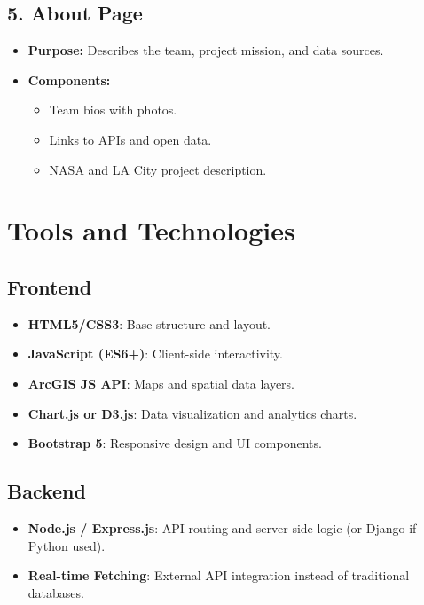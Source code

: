 \documentclass[12pt]{article}
\begin{document}
\subsection{5. About Page}
\begin{itemize}[leftmargin=*]
    \item \textbf{Purpose:} Describes the team, project mission, and data sources.
    \item \textbf{Components:}
    \begin{itemize}
        \item Team bios with photos.
        \item Links to APIs and open data.
        \item NASA and LA City project description.
    \end{itemize}
\end{itemize}

\newpage
\section{Tools and Technologies}

\subsection{Frontend}
\begin{itemize}[leftmargin=*]
    \item \textbf{HTML5/CSS3}: Base structure and layout.
    \item \textbf{JavaScript (ES6+)}: Client-side interactivity.
    \item \textbf{ArcGIS JS API}: Maps and spatial data layers.
    \item \textbf{Chart.js or D3.js}: Data visualization and analytics charts.
    \item \textbf{Bootstrap 5}: Responsive design and UI components.
\end{itemize}

\subsection{Backend}
\begin{itemize}[leftmargin=*]
    \item \textbf{Node.js / Express.js}: API routing and server-side logic (or Django if Python used).
    \item \textbf{Real-time Fetching}: External API integration instead of traditional databases.
\end{itemize}
\end{document}
